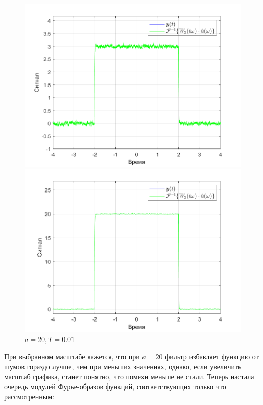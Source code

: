 \documentclass[a4paper]{article}
\begin{document}
\begin{figure}[H]
    \begin{minipage}{0.5\textwidth}
        \centering
        \includegraphics[width=\linewidth]{ex1_1/a=3_T=0.01/h2.png}
        \caption{$a = 3, T = 0.01$}
    \end{minipage}
    \begin{minipage}{0.5\textwidth}
        \centering
        \includegraphics[width=\linewidth]{ex1_1/a=20_T=0.01/h2.png}
        \caption{$a = 20, T = 0.01$}
    \end{minipage}
\end{figure}

При выбранном масштабе кажется, что при $a = 20$ фильтр избавляет функцию от шумов гораздо лучше, чем при меньших значениях, однако, если увеличить масштаб графика, станет понятно, что помехи меньше не стали. Теперь настала очередь модулей Фурье-образов функций, соответствующих только что рассмотренным:
\end{document}
